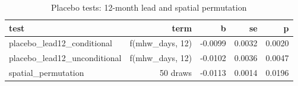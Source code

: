 \begin{table}[htbp]
\centering
\caption{Placebo tests: 12-month lead and spatial permutation}
\label{tab:placebo}
\begin{tabular}{lrrrr}
\hline
test & term & b & se & p
\\ \hline
placebo\_lead12\_conditional & f(mhw\_days, 12) & -0.0099 & 0.0032 & 0.0020 \\
placebo\_lead12\_unconditional & f(mhw\_days, 12) & -0.0102 & 0.0036 & 0.0047 \\
spatial\_permutation & 50 draws & -0.0113 & 0.0014 & 0.0196 \\
\hline
\end{tabular}
\end{table}
